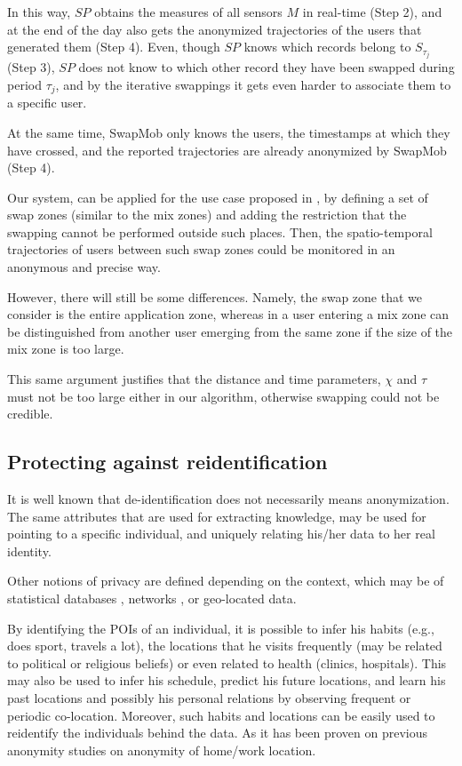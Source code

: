 \documentclass{llncs}
\begin{document}
In this way, $SP$ obtains the measures of all sensors $M$ in real-time (Step 2), and at the end of the day also gets the anonymized trajectories of the users that generated them (Step 4).
Even, though $SP$ knows which records belong to $S_{\tau_j}$ (Step 3), $SP$ does not know to which other record they have been swapped during period $\tau_j$, and by the iterative swappings it gets even harder to associate them to a specific user.

At the same time, SwapMob only knows the users, the timestamps at which they have crossed, and the reported trajectories are already anonymized by SwapMob (Step 4).

Our system, can be applied for the use case proposed in \cite{Beresford2003}, by defining a set of swap zones (similar to the mix zones) and adding the restriction that the swapping cannot be performed outside such places. Then, the spatio-temporal trajectories of users between such swap zones could be monitored in an anonymous and precise way.


However, there will still be some differences. Namely, the swap zone that we consider is the entire application zone, whereas in \cite{Beresford2003} a user entering a mix zone can be distinguished from another user emerging from the same zone if the size of the mix zone is too large.

This same argument justifies that the distance and time parameters, $\chi$ and $\tau$ must not be too large either in our algorithm, otherwise swapping could not be credible.



\subsection{Protecting against reidentification} %
It is well known that de-identification does not necessarily means anonymization. The same attributes that are used for extracting knowledge, may be used for pointing to a specific individual, and uniquely relating his/her data to her real identity.

Other notions of privacy are defined depending on the context, which may be of statistical databases \cite{Danezis15}, networks \cite{Zhou:2008}, or geo-located data.

By identifying the POIs of an individual, it is possible to infer his habits (e.g., does sport, travels a lot), the locations that he visits frequently (may be related to political or religious beliefs) or even related to health (clinics, hospitals). This may also be used to infer his schedule, predict his future locations,  and learn his past locations and possibly his personal relations by observing frequent or periodic co-location.
Moreover, such habits and locations can be easily used to reidentify the individuals behind the data. As it has been proven on previous anonymity studies on anonymity of home/work location.
\end{document}
